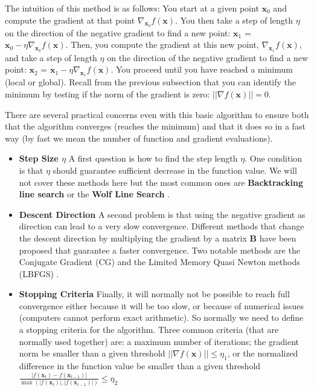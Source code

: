 The intuition of this method is as follows: You start at a given point $\textbf{x}_0$ and compute the gradient at that point $\nabla_{\textbf{x}_0} f(\textbf{x})$. You then take a step of length $\eta$ on the direction of the negative gradient to find a new point: $\textbf{x}_1$ = $\textbf{x}_0 - \eta \nabla_{\textbf{x}_{0}}
f(\textbf{x})$. Then, you compute the gradient at this new point, $\nabla_{\textbf{x}_1} f(\textbf{x})$, and take a step of length $\eta$ on the direction of the negative gradient to find a new point: $\textbf{x}_2$ = $\textbf{x}_1 - \eta \nabla_{\textbf{x}_{1}} f(\textbf{x})$. You proceed until you have reached a minimum (local or global). Recall from the previous subsection that you can identify the minimum by testing if the norm of the gradient is zero: $||\nabla f(\textbf{x})|| = 0$.

There are several practical concerns even with this basic algorithm to ensure both that the algorithm converges (reaches the minimum) and that it does so in a fast way (by fast we mean the number of function and gradient evaluations).

\begin{itemize}
\item \textbf{Step Size $\eta$} A first question is how to find the step length $\eta$. One condition is that $\eta$ should guarantee sufficient decrease in the function value. We will not cover these methods here but the most common ones are \textbf{Backtracking line search} or the \textbf{Wolf Line Search} \citep{Nocedal1999}.
\item \textbf{Descent Direction}  A second problem is that using the negative gradient as direction can lead to a very slow convergence. Different methods that change the descent direction by multiplying the gradient by a matrix $\textbf{B}$ have been proposed that guarantee a faster convergence. Two notable methods are the Conjugate Gradient (CG) and the Limited Memory Quasi Newton methods (LBFGS) \citep{Nocedal1999}.
\item \textbf{Stopping Criteria} Finally, it will normally not be possible to reach full convergence either because it will be too slow, or because of numerical issues (computers cannot perform exact arithmetic). So normally we need to define a stopping criteria for the algorithm. Three common criteria (that are normally used together) are: a maximum number of iterations; the gradient norm be smaller than a given threshold   $||\nabla f(\textbf{x})|| \leq \eta_1$, or the normalized difference in the function value be smaller than a given threshold $\frac{|f(\textbf{x}_t) - f(\textbf{x}_{t-1})|}{\max(|f(\textbf{x}_t)|,|f(\textbf{x}_{t-1})|)} \leq \eta_2$
\end{itemize}

